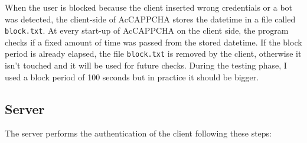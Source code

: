 When the user is blocked because the client inserted wrong credentials or a bot was detected, the client-side of AcCAPPCHA stores the datetime in a file called \texttt{block.txt}. At every start-up of AcCAPPCHA on the client side, the program checks if a fixed amount of time was passed from the stored datetime. If the block period is already elapsed, the file \texttt{block.txt} is removed by the client, otherwise it isn't touched and it will be used for future checks. During the testing phase, I used a block period of 100 seconds but in practice it should be bigger.

\subsection{Server}
The server performs the authentication of the client following these steps:
